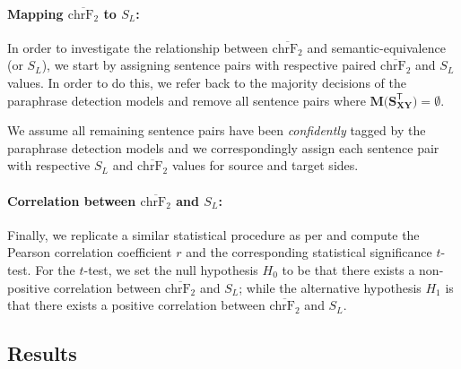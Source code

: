 \documentclass[11pt,a4paper]{article}
\begin{document}
\paragraph{Mapping $\overline{\text{chrF}_2}$ to $S_L$:} In order to investigate the relationship between $\overline{\text{chrF}_2}$ and semantic-equivalence (or $S_L$), we start by assigning sentence pairs with respective paired $\overline{\text{chrF}_2}$ and $S_L$ values. In order to do this, we refer back to the majority decisions of the paraphrase detection models and remove all sentence pairs where $\mathbf{M(S_{XY}^{\mathsf{T}}}) = \emptyset$.

We assume all remaining sentence pairs have been \textit{confidently} tagged by the paraphrase detection models and we correspondingly assign each sentence pair with respective $S_L$ and $\overline{\text{chrF}_2}$ values for source and target sides.

\paragraph{Correlation between $\overline{\text{chrF}_2}$ and $S_L$:} Finally, we replicate a similar statistical procedure as per \citet{michel2019evaluation} and compute the Pearson correlation coefficient $r$ and the corresponding statistical significance $t$-test. For the $t$-test, we set the null hypothesis $H_0$ to be that there exists a non-positive correlation between $\overline{\text{chrF}_2}$ and $S_L$; while the alternative hypothesis $H_1$ is that there exists a positive correlation between $\overline{\text{chrF}_2}$ and $S_L$.


\subsection{Results}

\end{document}
